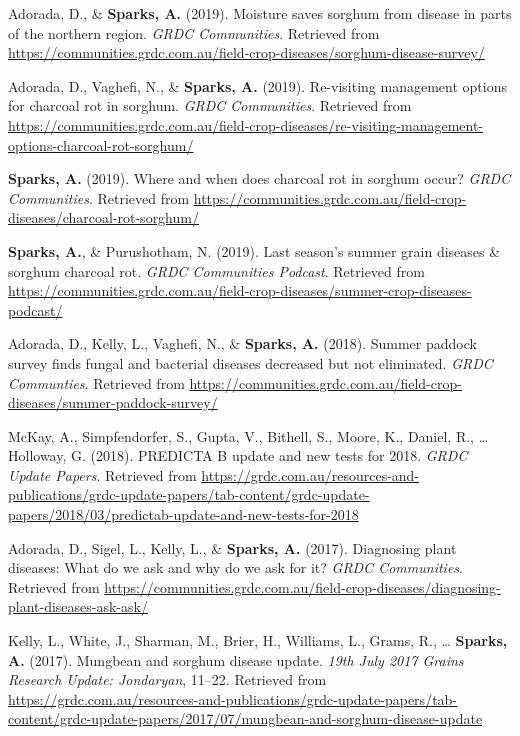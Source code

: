 \documentclass[11pt, a4paper]{awesome-cv}
\begin{document}
\leavevmode\hypertarget{ref-Adorada2019b}{}%
Adorada, D., \& \textbf{Sparks, A.} (2019). Moisture saves sorghum from disease in parts of the northern region. \emph{GRDC Communities}. Retrieved from \url{https://communities.grdc.com.au/field-crop-diseases/sorghum-disease-survey/}

\leavevmode\hypertarget{ref-Adorada2019c}{}%
Adorada, D., Vaghefi, N., \& \textbf{Sparks, A.} (2019). Re-visiting management options for charcoal rot in sorghum. \emph{GRDC Communities}. Retrieved from \url{https://communities.grdc.com.au/field-crop-diseases/re-visiting-management-options-charcoal-rot-sorghum/}

\leavevmode\hypertarget{ref-Sparks2019a}{}%
\textbf{Sparks, A.} (2019). Where and when does charcoal rot in sorghum occur? \emph{GRDC Communities}. Retrieved from \url{https://communities.grdc.com.au/field-crop-diseases/charcoal-rot-sorghum/}

\leavevmode\hypertarget{ref-Sparks2019b}{}%
\textbf{Sparks, A.}, \& Purushotham, N. (2019). Last season's summer grain diseases \& sorghum charcoal rot. \emph{GRDC Communities Podcast}. Retrieved from \url{https://communities.grdc.com.au/field-crop-diseases/summer-crop-diseases-podcast/}

\leavevmode\hypertarget{ref-Adorada2019d}{}%
Adorada, D., Kelly, L., Vaghefi, N., \& \textbf{Sparks, A.} (2018). Summer paddock survey finds fungal and bacterial diseases decreased but not eliminated. \emph{GRDC Communties}. Retrieved from \url{https://communities.grdc.com.au/field-crop-diseases/summer-paddock-survey/}

\leavevmode\hypertarget{ref-McKay2018}{}%
McKay, A., Simpfendorfer, S., Gupta, V., Bithell, S., Moore, K., Daniel, R., \ldots{} Holloway, G. (2018). PREDICTA B update and new tests for 2018. \emph{GRDC Update Papers}. Retrieved from \url{https://grdc.com.au/resources-and-publications/grdc-update-papers/tab-content/grdc-update-papers/2018/03/predictab-update-and-new-tests-for-2018}

\leavevmode\hypertarget{ref-Adorada2017}{}%
Adorada, D., Sigel, L., Kelly, L., \& \textbf{Sparks, A.} (2017). Diagnosing plant diseases: What do we ask and why do we ask for it? \emph{GRDC Communities}. Retrieved from \url{https://communities.grdc.com.au/field-crop-diseases/diagnosing-plant-diseases-ask-ask/}

\leavevmode\hypertarget{ref-Kelly2017}{}%
Kelly, L., White, J., Sharman, M., Brier, H., Williams, L., Grams, R., \ldots{} \textbf{Sparks, A.} (2017). Mungbean and sorghum disease update. \emph{19th July 2017 Grains Research Update: Jondaryan}, 11--22. Retrieved from \url{https://grdc.com.au/resources-and-publications/grdc-update-papers/tab-content/grdc-update-papers/2017/07/mungbean-and-sorghum-disease-update}
\end{document}

